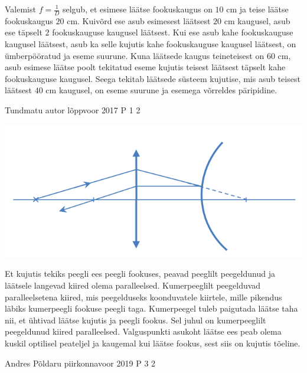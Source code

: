 \documentclass[11pt]{article}
\begin{document}
{{\ifSolution
Valemist $f = \frac{1}{D}$ selgub, et esimese läätse fookuskaugus on $10$ cm ja teise läätse fookuskaugus $20$ cm. Kuivõrd ese asub esimesest läätsest $20$ cm kaugusel, asub ese täpselt $2$ fookuskauguse kaugusel läätsest. Kui ese asub kahe fookuskauguse kaugusel läätsest, asub ka selle kujutis kahe fookuskauguse kaugusel läätsest, on ümberpööratud ja eseme suurune. Kuna läätsede kaugus teineteisest on $60$ cm, asub esimese läätse poolt tekitatud eseme kujutis teisest läätsest täpselt kahe fookuskauguse kaugusel. Seega tekitab läätsede süsteem kujutise, mis asub teisest läätsest $40$ cm kaugusel, on eseme suurune ja esemega võrreldes päripidine.
\fi
}


{Tundmatu autor} %
{lõppvoor} %
{2017} %
{P 1} %
{2} %
{

\ifSolution
\begin{center}
	\includegraphics[width=0.5\linewidth]{2017-v3p-01-lah.PNG}
\end{center}
Et kujutis tekiks peegli ees peegli fookuses, peavad peeglilt peegeldunud ja läätsele langevad kiired olema paralleelsed. Kumerpeeglilt peegelduvad paralleelsetena kiired, mis peegelduseks koonduvatele kiirtele, mille pikendus läbiks kumerpeegli fookuse peegli taga. Kumerpeegel tuleb paigutada läätse taha nii, et ühtivad läätse kujutis ja peegli fookus. Sel juhul on kumerpeeglilt peegeldunud kiired paralleelsed. Valguspunkti asukoht läätse ees peab olema kuskil optilisel peateljel ja kaugemal kui läätse fookus, sest siis on kujutis tõeline.
\fi
}


{Andres Põldaru} %
{piirkonnavoor} %
{2019} %
{P 3} %
{2} %
{

}}
\end{document}
